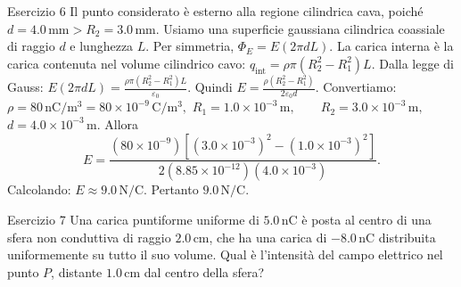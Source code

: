 \documentclass[a4paper]{article}
\begin{document}
\begin{snippetsolution}{Esercizio 6}
    Il punto considerato è esterno alla regione cilindrica cava, poiché
    \(d = 4.0\,\mathrm{mm} > R_2 = 3.0\,\mathrm{mm}.\)
    Usiamo una superficie gaussiana cilindrica coassiale di raggio \(d\) e
    lunghezza \(L\). Per simmetria,
    \(\Phi_E = E(2\pi dL).\)
    La carica interna è la carica contenuta nel volume cilindrico cavo:
    \(q_{\mathrm{int}} = \rho \pi (R_2^2 - R_1^2)L.\)
    Dalla legge di Gauss:
    \(E(2\pi dL) = \frac{ \rho \pi (R_2^2 - R_1^2)L }{\varepsilon_0}.\)
    Quindi
    \(E = \frac{ \rho(R_2^2 - R_1^2) }{ 2\varepsilon_0 d }.\)
    Convertiamo:
    \(\rho = 80\,\mathrm{nC/m^3} = 80 \times 10^{-9}\,\mathrm{C/m^3},\)
    \(R_1 = 1.0 \times 10^{-3}\,\mathrm{m}, \qquad R_2 = 3.0 \times 10^{-3}\,\mathrm{m},\)
    \(d = 4.0 \times 10^{-3}\,\mathrm{m}.\)
    Allora
    \[
        E =
        \frac{
            \left(80 \times 10^{-9}\right)
            \left[
                \left(3.0 \times 10^{-3}\right)^2
                -
                \left(1.0 \times 10^{-3}\right)^2
            \right]
        }{
            2
            \left(8.85 \times 10^{-12}\right)
            \left(4.0 \times 10^{-3}\right)
        }.
    \]
    Calcolando:
    \(E \approx 9.0\,\mathrm{N/C}.\)
    Pertanto
    \(\boxed{9.0\,\mathrm{N/C}}.\)
\end{snippetsolution}
\begin{snippetexercise}{Esercizio 7}
    Una carica puntiforme uniforme di \(5.0\,\mathrm{nC}\) è posta al centro di
    una sfera non conduttiva di raggio \(2.0\,\mathrm{cm}\), che ha una carica
    di \(-8.0\,\mathrm{nC}\) distribuita uniformemente su tutto il suo volume.
    Qual è l'intensità del campo elettrico nel punto \(P\), distante
    \(1.0\,\mathrm{cm}\) dal centro della sfera?

\end{snippetexercise}
\end{document}
